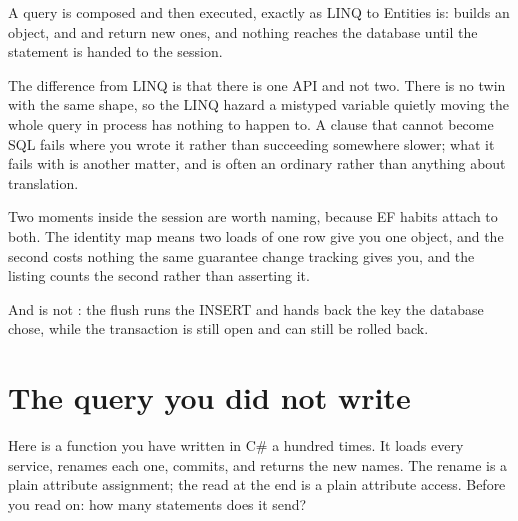 A query is composed and then executed, exactly as LINQ to Entities is:
 builds an object,  and  and
 return new ones, and nothing reaches the database until
the statement is handed to the session.


The difference from LINQ is that there is one API and not two. There is no
 twin with the same shape, so the LINQ hazard \dash{} a
mistyped variable quietly moving the whole query in process \dash{} has
nothing to happen to. A clause that cannot become SQL fails where you wrote
it rather than succeeding somewhere slower; what it fails with is another
matter, and is often an ordinary  rather than anything
about translation.

Two moments inside the session are worth naming, because EF habits attach
to both. The identity map means two loads of one row give you one object,
and the second costs nothing \dash{} the same guarantee change tracking
gives you, and the listing counts the second rather than asserting it.


And  is not : the flush runs the INSERT and
hands back the key the database chose, while the transaction is still open
and can still be rolled back.



\section{The query you did not write}
\label{sec:ch10-expire}

Here is a function you have written in C\# a hundred times. It loads every
service, renames each one, commits, and returns the new names. The rename is
a plain attribute assignment; the read at the end is a plain attribute
access. Before you read on: how many statements does it send?

